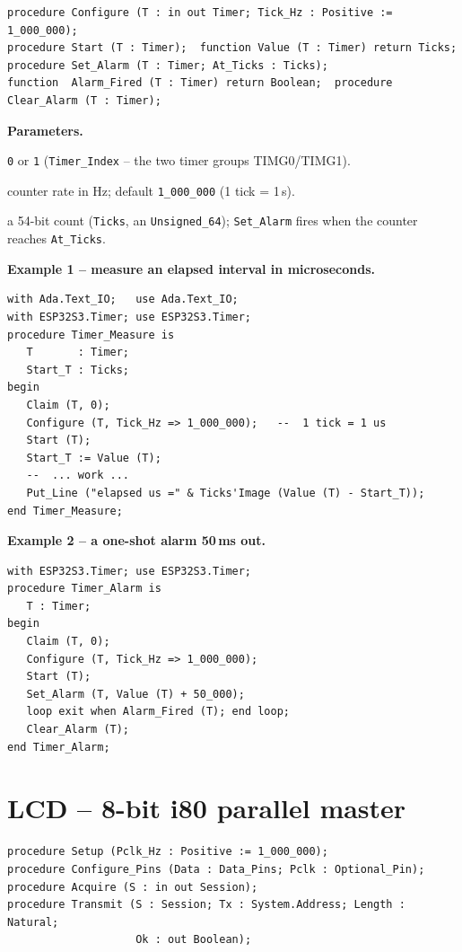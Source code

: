 \begin{lstlisting}
procedure Configure (T : in out Timer; Tick_Hz : Positive := 1_000_000);
procedure Start (T : Timer);  function Value (T : Timer) return Ticks;
procedure Set_Alarm (T : Timer; At_Ticks : Ticks);
function  Alarm_Fired (T : Timer) return Boolean;  procedure Clear_Alarm (T : Timer);
\end{lstlisting}

\textbf{Parameters.}
\begin{description}[style=nextline]
\item[\texttt{Index}] \texttt{0} or \texttt{1} (\texttt{Timer\_Index} -- the two
  timer groups TIMG0/TIMG1).
\item[\texttt{Tick\_Hz}] counter rate in Hz; default \texttt{1\_000\_000}
  (1 tick = 1\,\textmu s).
\item[\texttt{At\_Ticks} / \texttt{Value}] a 54-bit count (\texttt{Ticks}, an
  \texttt{Unsigned\_64}); \texttt{Set\_Alarm} fires when the counter reaches
  \texttt{At\_Ticks}.
\end{description}

\textbf{Example 1 -- measure an elapsed interval in microseconds.}
\begin{lstlisting}
with Ada.Text_IO;   use Ada.Text_IO;
with ESP32S3.Timer; use ESP32S3.Timer;
procedure Timer_Measure is
   T       : Timer;
   Start_T : Ticks;
begin
   Claim (T, 0);
   Configure (T, Tick_Hz => 1_000_000);   --  1 tick = 1 us
   Start (T);
   Start_T := Value (T);
   --  ... work ...
   Put_Line ("elapsed us =" & Ticks'Image (Value (T) - Start_T));
end Timer_Measure;
\end{lstlisting}

\textbf{Example 2 -- a one-shot alarm 50\,ms out.}
\begin{lstlisting}
with ESP32S3.Timer; use ESP32S3.Timer;
procedure Timer_Alarm is
   T : Timer;
begin
   Claim (T, 0);
   Configure (T, Tick_Hz => 1_000_000);
   Start (T);
   Set_Alarm (T, Value (T) + 50_000);
   loop exit when Alarm_Fired (T); end loop;
   Clear_Alarm (T);
end Timer_Alarm;
\end{lstlisting}

\section{LCD -- 8-bit i80 parallel master}

\begin{lstlisting}
procedure Setup (Pclk_Hz : Positive := 1_000_000);
procedure Configure_Pins (Data : Data_Pins; Pclk : Optional_Pin);
procedure Acquire (S : in out Session);
procedure Transmit (S : Session; Tx : System.Address; Length : Natural;
                    Ok : out Boolean);
\end{lstlisting}

